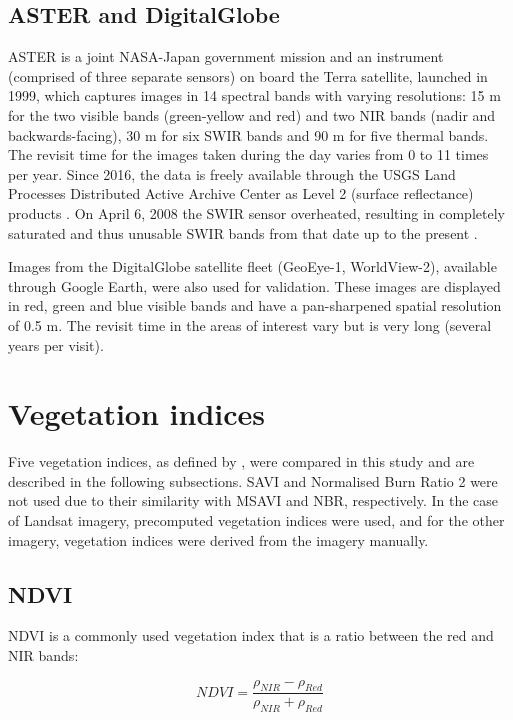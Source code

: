 \documentclass[a4paper,12pt]{scrbook}
\begin{document}
\subsection{ASTER and DigitalGlobe}

\ac{ASTER} is a joint NASA-Japan government mission and an instrument (comprised of three separate sensors) on board the Terra satellite, launched in 1999, which captures images in 14 spectral bands with varying resolutions: 15 m for the two visible bands (green-yellow and red) and two \ac{NIR} bands (nadir and backwards-facing), 30 m for six \ac{SWIR} bands and 90 m for five thermal bands. The revisit time for the images taken during the day varies from 0 to 11 times per year. Since 2016, the data is freely available through the \ac{USGS} Land Processes Distributed Active Archive Center as Level 2 (surface reflectance) products \citep{nasa_lp_daac_aster_2006}. On April 6, 2008 the \ac{SWIR} sensor overheated, resulting in completely saturated and thus unusable \ac{SWIR} bands from that date up to the present \citep{meyer_advanced_2015}.

Images from the DigitalGlobe satellite fleet (GeoEye-1, WorldView-2), available through Google Earth, were also used for validation. These images are displayed in red, green and blue visible bands and have a pan-sharpened spatial resolution of 0.5 m. The revisit time in the areas of interest vary but is very long (several years per visit).

\section{Vegetation indices} \label{sec-vis}

Five vegetation indices, as defined by \citet{u.s._geological_survey_product_2017_3}, were compared in this study and are described in the following subsections. \ac{SAVI} and Normalised Burn Ratio 2 were not used due to their similarity with \ac{MSAVI} and \ac{NBR}, respectively. In the case of Landsat imagery, precomputed vegetation indices were used, and for the other imagery, vegetation indices were derived from the imagery manually.

\subsection{NDVI}

\ac{NDVI} is a commonly used vegetation index that is a ratio between the red and \ac{NIR} bands:

$$ NDVI = \frac{\rho_{NIR} - \rho_{Red}}{\rho_{NIR} + \rho_{Red}} $$
\end{document}
